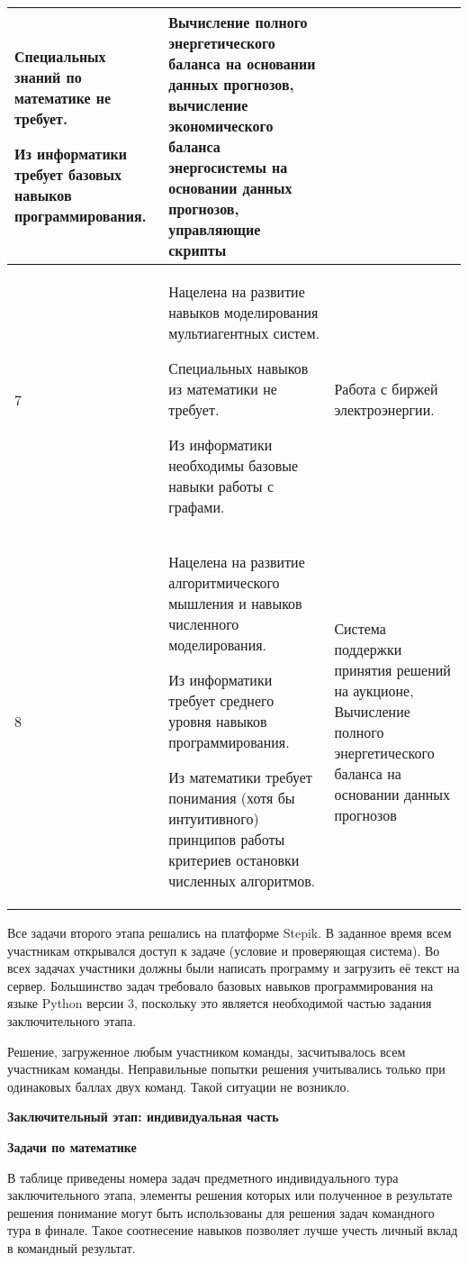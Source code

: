 \begin{center}
\begin{longtable}{|p{2cm}|p{8cm}|p{5cm}|}
Специальных знаний по математике не требует.

Из информатики требует базовых навыков программирования.& Вычисление полного энергетического баланса на основании данных прогнозов, вычисление экономического баланса энергосистемы на основании данных прогнозов, управляющие скрипты\\
\hline
7& Нацелена на развитие навыков моделирования мультиагентных систем.

Специальных навыков из математики не требует.

Из информатики необходимы базовые навыки работы с графами.& Работа с биржей электроэнергии.\\
\hline
8& Нацелена на развитие алгоритмического мышления и навыков численного моделирования.

Из информатики требует среднего уровня навыков программирования.

Из математики требует понимания (хотя бы интуитивного) принципов работы критериев остановки численных алгоритмов.& Система поддержки принятия решений на аукционе, Вычисление полного энергетического баланса на основании данных прогнозов\\
\hline
\end{longtable}
\end{center}

Все задачи второго этапа решались на платформе Stepik. В заданное время всем участникам открывался доступ к задаче (условие и проверяющая система). Во всех задачах участники должны были написать программу и загрузить её текст на сервер. Большинство задач требовало базовых навыков программирования на языке Python версии 3, поскольку это является необходимой частью задания заключительного этапа.

Решение, загруженное любым участником команды, засчитывалось всем участникам команды. Неправильные попытки решения учитывались только при одинаковых баллах двух команд. Такой ситуации не возникло.

\textbf{Заключительный этап: индивидуальная часть}

\textbf{Задачи по математике}

В таблице приведены номера задач предметного индивидуального тура заключительного этапа, элементы решения которых или полученное в результате решения понимание могут быть использованы для решения задач командного тура в финале. Такое соотнесение навыков позволяет лучше учесть личный вклад в командный результат.

